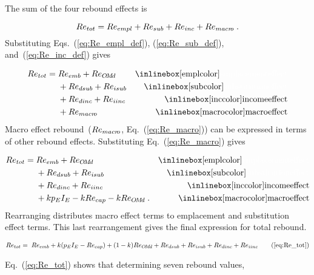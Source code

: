 The sum of the four rebound effects is

\begin{equation}
  Re_{tot} = Re_{empl} + Re_{sub} + Re_{inc} + Re_{macr\!o} \; .
\end{equation}
%
Substituting Eqs.~(\ref{eq:Re_empl_def}), (\ref{eq:Re_sub_def}), and~(\ref{eq:Re_inc_def}) gives

\begin{align}
  Re_{tot} = \; &Re_{emb} + Re_{\omd}      & \mathrm{\empleffect} \nonumber \\
                &+ Re_{dsub} + Re_{isub}   & \mathrm{\subeffect}  \nonumber \\
                &+ Re_{dinc} + Re_{iinc}   & \mathrm{\inceffect}  \nonumber \\
                &+ Re_{\macro}      & \mathrm{\macroeffect}
\end{align}
%
Macro effect rebound~($Re_{macr\!o}$, Eq.~(\ref{eq:Re_macro}))
can be expressed in terms of other rebound effects.
Substituting Eq.~(\ref{eq:Re_macro}) gives

\begin{align}
  Re_{tot} = \; &Re_{emb} + Re_{\omd}      & \mathrm{\empleffect}       \nonumber \\
                &+ Re_{dsub} + Re_{isub}   & \mathrm{\subeffect}        \nonumber \\
                &+ Re_{dinc} + Re_{iinc}   & \mathrm{\inceffect}        \nonumber \\
                &+ k p_E I_E - k Re_{cap} - k Re_{\omd} \; .  & \mathrm{\macroeffect}
\end{align}
%
Rearranging distributes macro effect terms
to emplacement and substitution effect terms.
This last rearrangement gives the final expression for total rebound.

\begin{align}
  Re_{tot} = \; \Retoteqn{} \tag{\ref{eq:Re_tot}}
\end{align}

Eq.~(\ref{eq:Re_tot}) shows that determining seven rebound values,

